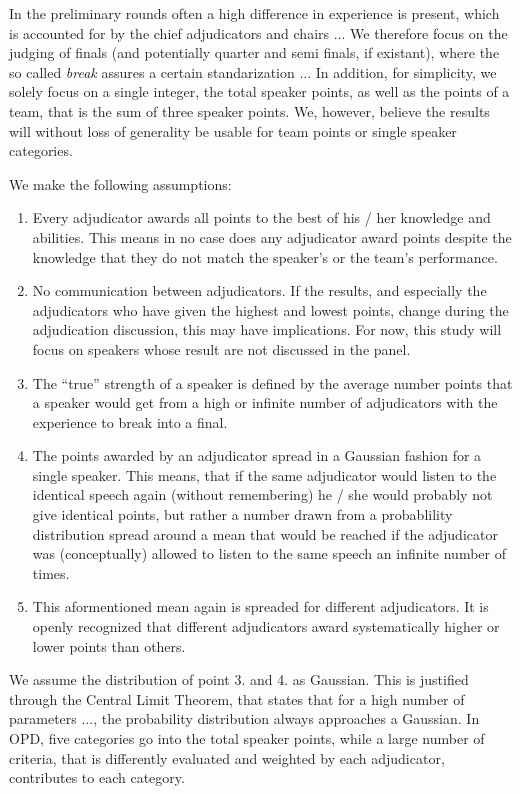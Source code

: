 \documentclass[%
 reprint,
 amsmath,amssymb,
 aps,
]{revtex4-1}
\begin{document}
In the preliminary rounds often a high difference in experience is present, which is accounted for by the chief adjudicators and chairs ...  We therefore focus on the judging of finals (and potentially quarter and semi finals, if existant), where the so called \textit{break} assures a certain standarization ... In addition, for simplicity, we solely focus on a single integer, the total speaker points, as well as the points of a team, that is the sum of three speaker points. We, however, believe the results will without loss of generality be usable for team points or single speaker categories. 

We make the following assumptions:
\begin{enumerate}
	\item Every adjudicator awards all points to the best of his / her knowledge and abilities. This means in no case does any adjudicator award points despite the knowledge that they do not match the speaker's or the team's performance. 
	\item No communication between adjudicators. If the results, and especially the adjudicators who have given the highest and lowest points, change during the adjudication discussion, this may have implications. For now, this study will focus on speakers whose result are not discussed in the panel.  
	\item The ``true'' strength of a speaker is defined by the average number points that a speaker would get from a high or infinite number of adjudicators with the experience to break into a final. 
	\item The points awarded by an adjudicator spread in a Gaussian fashion for a single speaker. This means, that if the same adjudicator would listen to the identical speech again (without remembering) he / she would probably not give identical points, but rather a number drawn from a probablility distribution spread around a mean that would be reached if the adjudicator was (conceptually) allowed to listen to the same speech an infinite number of times. 
	\item This aformentioned mean again is spreaded for different adjudicators. It is openly recognized that different adjudicators award systematically higher  or lower points than others. 
\end{enumerate}

We assume the distribution of point 3. and 4. as Gaussian. This is justified through the Central Limit Theorem, that states that for a high number of parameters ..., the probability distribution always approaches a Gaussian. In OPD, five categories go into the total speaker points, while a large number of criteria, that is differently evaluated and weighted by each adjudicator, contributes to each category. 
\end{document}
